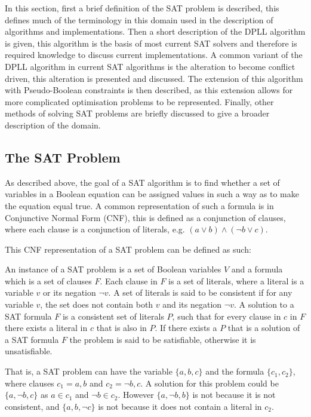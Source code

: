 In this section, first a brief definition of the SAT problem is described, this defines much of the terminology in this domain used in the description of algorithms and implementations. 
Then a short description of the DPLL algorithm is given, this algorithm is the basis of most current SAT solvers and therefore is required knowledge to discuss current implementations.
A common variant of the DPLL algorithm in current SAT algorithms is the alteration to become conflict driven,
this alteration is presented and discussed.
The extension of this algorithm with Pseudo-Boolean constraints is then described,
as this extension allows for more complicated optimisation problems to be represented.
Finally, other methods of solving SAT problems are briefly discussed to give a broader description of the domain. 

\subsection{The SAT Problem}
As described above, the goal of a SAT algorithm is to find whether a set of variables in a Boolean equation can be assigned values in such a way as to make the equation equal true.
A common representation of such a formula is in Conjunctive Normal Form (CNF), this is defined as a conjunction of clauses, 
where each clause is a conjunction of literals, e.g. $(a \vee b) \wedge (\neg b \vee c)$.

This CNF representation of a SAT problem can be defined as such:
\begin{defs}
An instance of a SAT problem is a set of Boolean variables $V$ and a formula which is a set of clauses $F$.
Each clause in $F$ is a set of literals, where a literal is a variable $v$ or its negation $\neg v$.
A set of literals is said to be consistent if for any variable $v$, the set does not contain both $v$ and its negation $\neg v$.
A solution to a SAT formula $F$ is a consistent set of literals $P$, such that for every clause in $c$ in $F$ there exists a literal in $c$ that is also in $P$.
If there exists a $P$ that is a solution of a SAT formula $F$ the problem is said to be satisfiable, otherwise it is unsatisfiable. 
\end{defs}

That is, a SAT problem can have the variable $\{a,b,c\}$ and the formula $\{c_1,c_2\}$, where clauses $c_1 = {a,b}$ and $c_2 = {\neg b, c}$.
A solution for this problem could be $\{a,\neg b,c\}$ as $a \in c_1$ and $\neg b \in c_2$.
However $\{a, \neg b, b\}$ is not because it is not consistent, and $\{a, b, \neg c\}$ is not because it does not contain a literal in $c_2$.  

